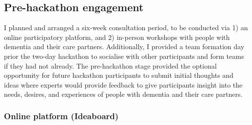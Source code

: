 \subsection{Pre-hackathon engagement}
\label{sec:EventPrehackathon}
I planned and arranged a six-week consultation period, to be conducted via 1) an online participatory platform, and 2) in-person workshops with people with dementia and their care partners. Additionally, I provided a team formation day prior the two-day hackathon to socialise with other participants and form teams if they had not already. The pre-hackathon stage provided the optional opportunity for future hackathon participants to submit initial thoughts and ideas where experts would provide feedback to give participants insight into the needs, desires, and experiences of people with dementia and their care partners. 

\subsubsection{Online platform (Ideaboard)}
\label{sec:Ideaboard}

